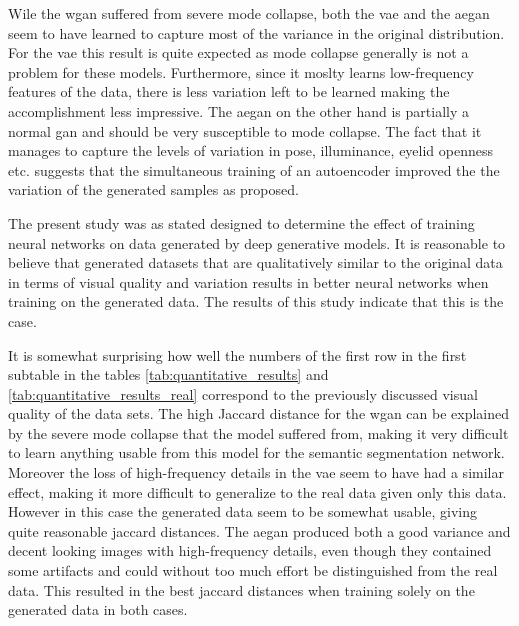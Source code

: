 Wile the \acrshort{wgan} suffered from severe mode collapse, both the \acrshort{vae} and the \acrshort{aegan} seem to have learned to capture most of the variance in the original distribution. For the \acrshort{vae} this result is quite expected as mode collapse generally is not a problem for these models. Furthermore, since it moslty learns low-frequency features of the data, there is less variation left to be learned making the accomplishment less impressive. The \acrshort{aegan} on the other hand is partially a normal \acrshort{gan} and should be very susceptible to mode collapse. The fact that it manages to capture the levels of variation in pose, illuminance, eyelid openness etc. suggests that the simultaneous training of an autoencoder improved the the variation of the generated samples as proposed.





The present study was as stated designed to determine the effect of training neural networks on data generated by deep generative models. It is reasonable to believe that generated datasets that are qualitatively similar to the original data in terms of visual quality and variation results in better neural networks when training on the generated data. The results of this study indicate that this is the case. 

It is somewhat surprising how well the numbers of the first row in the first subtable in the tables \ref{tab:quantitative_results} and \ref{tab:quantitative_results_real} correspond to the previously discussed visual quality of the data sets. 
The high Jaccard distance for the \acrshort{wgan} can be explained by the severe mode collapse that the model suffered from, making it very difficult to learn anything usable from this model for the semantic segmentation network. Moreover the loss of high-frequency details in the \acrshort{vae} seem to have had a similar effect, making it more difficult to generalize to the real data given only this data. However in this case the generated data seem to be somewhat usable, giving quite reasonable jaccard distances. The \acrshort{aegan} produced both a good variance and decent looking images with high-frequency details, even though they contained some artifacts and could without too much effort be distinguished from the real data. This resulted in the best jaccard distances when training solely on the generated data in both cases.

